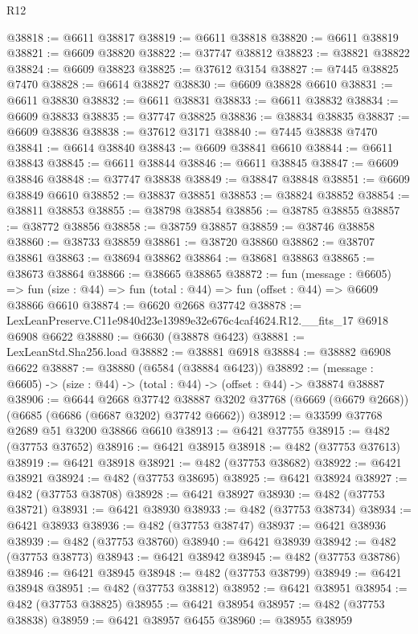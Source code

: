 \begin{lexlean}{R12}
\begin{coremodule}
@38818 := @6611 @38817
@38819 := @6611 @38818
@38820 := @6611 @38819
@38821 := @6609 @38820
@38822 := @37747 @38812
@38823 := @38821 @38822
@38824 := @6609 @38823
@38825 := @37612 @3154
@38827 := @7445 @38825 @7470
@38828 := @6614 @38827
@38830 := @6609 @38828 @6610
@38831 := @6611 @38830
@38832 := @6611 @38831
@38833 := @6611 @38832
@38834 := @6609 @38833
@38835 := @37747 @38825
@38836 := @38834 @38835
@38837 := @6609 @38836
@38838 := @37612 @3171
@38840 := @7445 @38838 @7470
@38841 := @6614 @38840
@38843 := @6609 @38841 @6610
@38844 := @6611 @38843
@38845 := @6611 @38844
@38846 := @6611 @38845
@38847 := @6609 @38846
@38848 := @37747 @38838
@38849 := @38847 @38848
@38851 := @6609 @38849 @6610
@38852 := @38837 @38851
@38853 := @38824 @38852
@38854 := @38811 @38853
@38855 := @38798 @38854
@38856 := @38785 @38855
@38857 := @38772 @38856
@38858 := @38759 @38857
@38859 := @38746 @38858
@38860 := @38733 @38859
@38861 := @38720 @38860
@38862 := @38707 @38861
@38863 := @38694 @38862
@38864 := @38681 @38863
@38865 := @38673 @38864
@38866 := @38665 @38865
@38872 := fun (message : @6605) =>
  fun (size : @44) => fun (total : @44) => fun (offset : @44) => @6609 @38866 @6610
@38874 := @6620 @2668 @37742
@38878 := LexLeanPreserve.C11e9840d23e13989e32e676c4caf4624.R12.__fits_17 @6918 @6908 @6622
@38880 := @6630 (@38878 @6423)
@38881 := LexLeanStd.Sha256.load
@38882 := @38881 @6918
@38884 := @38882 @6908 @6622
@38887 := @38880 (@6584 (@38884 @6423))
@38892 := (message : @6605) -> (size : @44) -> (total : @44) -> (offset : @44) -> @38874 @38887
@38906 := @6644
    @2668
    @37742
    @38887
    @3202
    @37768
    (@6669 (@6679 @2668))
    (@6685 (@6686 (@6687 @3202) @37742 @6662))
@38912 := @33599 @37768 @2689 @51 @3200 @38866 @6610
@38913 := @6421 @37755
@38915 := @482 (@37753 @37652)
@38916 := @6421 @38915
@38918 := @482 (@37753 @37613)
@38919 := @6421 @38918
@38921 := @482 (@37753 @38682)
@38922 := @6421 @38921
@38924 := @482 (@37753 @38695)
@38925 := @6421 @38924
@38927 := @482 (@37753 @38708)
@38928 := @6421 @38927
@38930 := @482 (@37753 @38721)
@38931 := @6421 @38930
@38933 := @482 (@37753 @38734)
@38934 := @6421 @38933
@38936 := @482 (@37753 @38747)
@38937 := @6421 @38936
@38939 := @482 (@37753 @38760)
@38940 := @6421 @38939
@38942 := @482 (@37753 @38773)
@38943 := @6421 @38942
@38945 := @482 (@37753 @38786)
@38946 := @6421 @38945
@38948 := @482 (@37753 @38799)
@38949 := @6421 @38948
@38951 := @482 (@37753 @38812)
@38952 := @6421 @38951
@38954 := @482 (@37753 @38825)
@38955 := @6421 @38954
@38957 := @482 (@37753 @38838)
@38959 := @6421 @38957 @6455
@38960 := @38955 @38959

\end{coremodule}
\end{lexlean}
